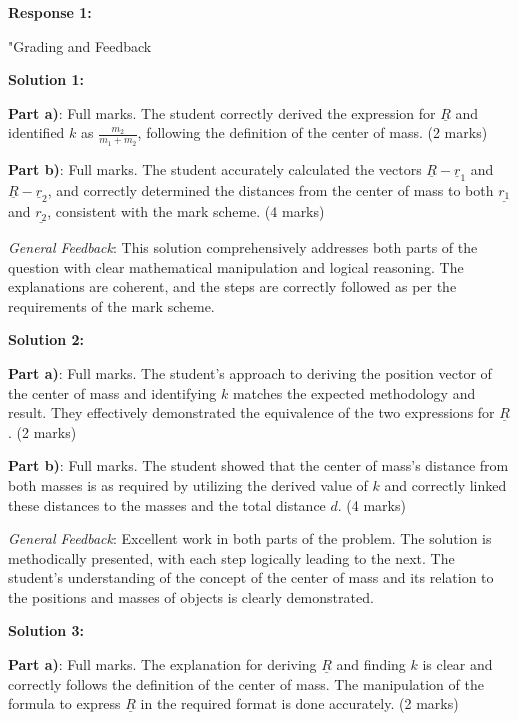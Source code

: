 \documentclass[a4paper,11pt]{article}
\begin{document}
\textbf{Response 1:}

"Grading and Feedback

\textbf{Solution 1:}

\textbf{Part a)}: Full marks. The student correctly derived the expression for \( \underline{R} \) and identified \( k \) as \( \frac{m_2}{m_1 + m_2} \), following the definition of the center of mass. (2 marks)

\textbf{Part b)}: Full marks. The student accurately calculated the vectors \( \underline{R} - \underline{r}_1 \) and \( \underline{R} - \underline{r}_2 \), and correctly determined the distances from the center of mass to both \( \underline{r_{1}} \) and \( \underline{r_{2}} \), consistent with the mark scheme. (4 marks)

\textit{General Feedback}: This solution comprehensively addresses both parts of the question with clear mathematical manipulation and logical reasoning. The explanations are coherent, and the steps are correctly followed as per the requirements of the mark scheme.

\hrulefill

\textbf{Solution 2:}

\textbf{Part a)}: Full marks. The student's approach to deriving the position vector of the center of mass and identifying \( k \) matches the expected methodology and result. They effectively demonstrated the equivalence of the two expressions for \( \underline{R} \). (2 marks)

\textbf{Part b)}: Full marks. The student showed that the center of mass's distance from both masses is as required by utilizing the derived value of \( k \) and correctly linked these distances to the masses and the total distance \( d \). (4 marks)

\textit{General Feedback}: Excellent work in both parts of the problem. The solution is methodically presented, with each step logically leading to the next. The student's understanding of the concept of the center of mass and its relation to the positions and masses of objects is clearly demonstrated.

\hrulefill

\textbf{Solution 3:}

\textbf{Part a)}: Full marks. The explanation for deriving \( \underline{R} \) and finding \( k \) is clear and correctly follows the definition of the center of mass. The manipulation of the formula to express \( \underline{R} \) in the required format is done accurately. (2 marks)
\end{document}
